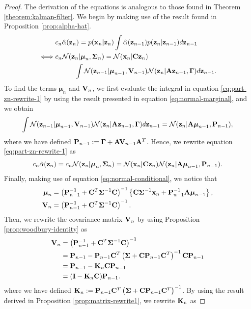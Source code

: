 \documentclass[12pt, oneside]{book}
\numberwithin{equation}{section}
\newcommand{\x}{{\bf x}}
\newcommand{\z}{{\bf z}}
\newcommand{\N}{\mathcal{N}}
\begin{document}
{\begin{proof}
	The derivation of the equations is analogous to those found in Theorem \ref{theorem:kalman-filter}. We begin by making use of the result found in Proposition \ref{prop:alpha-hat}. 
	\begin{align}
		&c_n \hat\alpha(\z_n) = p(\x_n\vert\z_n) \int \hat\alpha(\z_{n-1})p(\z_n \vert \z_{n-1}) d\z_{n-1}\\
		\iff& c_n \N(\z_n \vert \boldsymbol\mu_n, \boldsymbol\Sigma_n) = \N(\x_n \vert {\bf C}\z_n) \nonumber \\
			&\hspace{1cm} \int \N(\z_{n-1} \vert \boldsymbol\mu_{n-1}, {\bf V}_{n-1}) \N(\z_n \vert {\bf A}\z_{n-1}, \boldsymbol\Gamma) d\z_{n-1} \label{eq:part-zn-rewrite-1}.
	\end{align}
	To find the terms $\boldsymbol\mu_n$ and ${\bf V}_n$, we first evaluate the integral in equation \eqref{eq:part-zn-rewrite-1} by using the result presented in equation \eqref{eq:normal-marginal}, and we obtain
	\begin{equation}
		\int \N(\z_{n-1} \vert \boldsymbol\mu_{n-1}, {\bf V}_{n-1}) \N(\z_n \vert {\bf A}\z_{n-1}, \boldsymbol\Gamma) d\z_{n-1} = \N(\z_n \vert {\bf A} \boldsymbol\mu_{n-1}, {\bf P}_{n-1}),
	\end{equation}
	where we have defined ${\bf P}_{n-1} := \boldsymbol\Gamma + {\bf A}{\bf V}_{n-1}{\bf A}^T$. Hence, we rewrite equation \eqref{eq:part-zn-rewrite-1} as 
	\begin{equation} \label{eq:part-cnzn-rewrite}
		c_n\hat\alpha(\z_n)  = c_n \N(\z_n \vert \boldsymbol\mu_n, \boldsymbol\Sigma_n) = \N(\x_n \vert {\bf C}\z_n)  \N(\z_n \vert {\bf A} \boldsymbol\mu_{n-1}, {\bf P}_{n-1}).
	\end{equation}
	Finally, making use of equation \eqref{eq:normal-conditional}, we notice that
	\begin{align}
		\boldsymbol{\mu}_n &= \left({\bf P}_{n-1}^{-1} + {\bf C}^T \boldsymbol\Sigma^{-1}{\bf C}\right)^{-1} \left\{{\bf C}\boldsymbol\Sigma^{-1}\x_n + {\bf P}_{n-1}^{-1}{\bf A}\boldsymbol\mu_{n-1}\right\},\\
		{\bf V}_n &= \left({\bf P}_{n-1}^{-1} + {\bf C}^T \boldsymbol\Sigma^{-1}{\bf C}\right)^{-1}.
	\end{align}
	Then, we rewrite the covariance matrix ${\bf V}_n$ by using Proposition \ref{prop:woodbury-identity} as
	\begin{align}
		{\bf V}_n &= \left({\bf P}_{n-1}^{-1} + {\bf C}^T \boldsymbol\Sigma^{-1}{\bf C}\right)^{-1} \\
				  &= {\bf P}_{n-1} - {\bf P}_{n-1} {\bf C}^T\left(\boldsymbol\Sigma + {\bf C}{\bf P}_{n-1}{\bf C}^T\right)^{-1}{\bf C}{\bf P}_{n-1} \\
				  &= {\bf P}_{n-1} - {\bf K}_n{\bf C}{\bf P}_{n-1} \\
				  &= ({\bf I}- {\bf K}_n{\bf C}){\bf P}_{n-1}.
	\end{align}
	where we have defined ${\bf K}_n := {\bf P}_{n-1} {\bf C}^T\left(\boldsymbol\Sigma + {\bf C}{\bf P}_{n-1}{\bf C}^T\right)^{-1}$. By using the result derived in Proposition \ref{prop:matrix-rewrite1}, we rewrite ${\bf K}_n$ as
	

\end{proof}}
\end{document}
